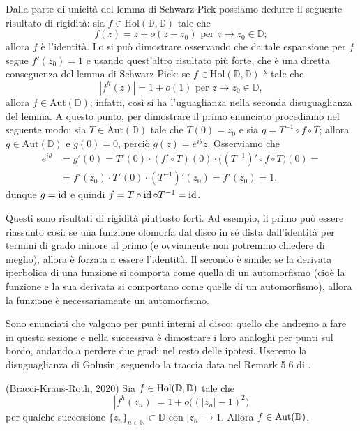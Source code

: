 Dalla parte di unicità del lemma di Schwarz-Pick possiamo dedurre il seguente risultato di rigidità: sia $f \in \text{Hol}(\mathbb{D},\mathbb{D})$ tale che
$$f(z)=z+o(z-z_0) \text{ per } z \longrightarrow z_0 \in \mathbb{D};$$
allora $f$ è l'identità. Lo si può dimostrare osservando che da tale espansione per $f$ segue $f'(z_0)=1$ e usando quest'altro risultato più forte, che è una diretta conseguenza del lemma di Schwarz-Pick: se $f \in \text{Hol}(\mathbb{D},\mathbb{D})$ è tale che
$$|f^h(z)|=1+o(1) \text{ per } z \longrightarrow z_0 \in \mathbb{D},$$
allora $f \in \text{Aut}(\mathbb{D})$; infatti, così si ha l'uguaglianza nella seconda disuguaglianza del lemma. A questo punto, per dimostrare il primo enunciato procediamo nel seguente modo: sia $T \in \text{Aut}(\mathbb{D})$ tale che $T(0)=z_0$ e sia $g=T^{-1}\circ f\circ T$; allora $g \in \text{Aut}(\mathbb{D})$ e $g(0)=0$, perciò $g(z)=e^{i\theta}z$. Osserviamo che
\begin{align*}
  e^{i\theta}&=g'(0)=T'(0)\cdot(f'\circ T)(0)\cdot\bigl((T^{-1})'\circ f\circ T\bigr)(0)= \\
  &=f'(z_0)\cdot T'(0)\cdot(T^{-1})'(z_0)=f'(z_0)=1,
\end{align*}
dunque $g=\operatorname{id}$ e quindi $f=T\circ \operatorname{id} \circ T^{-1}=\operatorname{id}$.

Questi sono risultati di rigidità piuttosto forti. Ad esempio, il primo può essere riassunto così: se una funzione olomorfa dal disco in sé dista dall'identità per termini di grado minore al primo (e ovviamente non potremmo chiedere di meglio), allora è forzata a essere l'identità. Il secondo è simile: se la derivata iperbolica di una funzione si comporta come quella di un automorfismo (cioè la funzione e la sua derivata si comportano come quelle di un automorfismo), allora la funzione è necessariamente un automorfismo.

Sono enunciati che valgono per punti interni al disco; quello che andremo a fare in questa sezione e nella successiva è dimostrare i loro analoghi per punti sul bordo, andando a perdere due gradi nel resto delle ipotesi. Useremo la disuguaglianza di Golusin, seguendo la traccia data nel Remark 5.6 di \cite{BKR}.

\begin{thm} \label{boundary_schwarz_pick}
  (Bracci-Kraus-Roth, 2020) Sia $f \in \text{\normalfont{Hol}}(\mathbb{D},\mathbb{D})$ tale che
  \begin{equation} \label{n_o^2}
    |f^h(z_n)|=1+o\bigl((|z_n|-1)^2\bigr)
  \end{equation}
  per qualche successione $\{z_n\}_{n \in \mathbb{N}} \subset \mathbb{D}$ con $|z_n| \longrightarrow 1$. Allora $f \in \text{\normalfont{Aut}}(\mathbb{D})$.
\end{thm}

